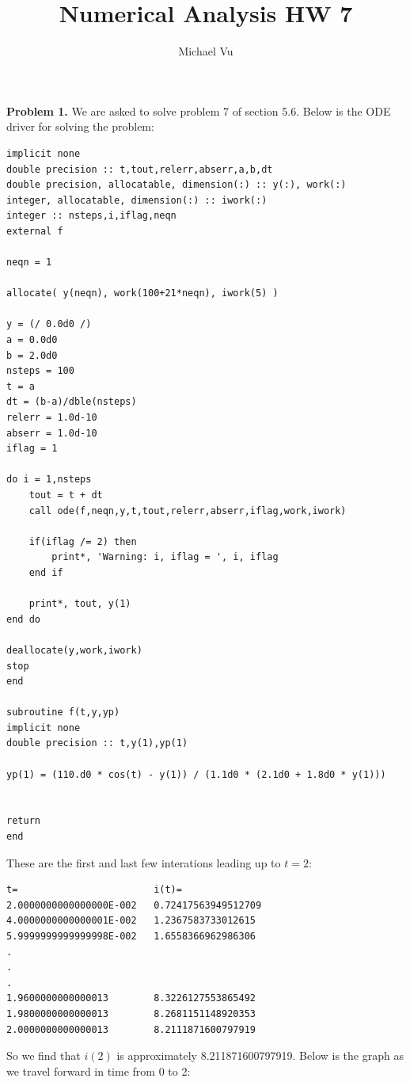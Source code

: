 \documentclass[12pt]{article}
\author{Michael Vu}
\title{Numerical Analysis HW 7}
\begin{document}
\maketitle 

\textbf{Problem 1.} We are asked to solve problem 7 of section 5.6. Below is the ODE driver for solving the problem:

\begin{verbatim}
implicit none
double precision :: t,tout,relerr,abserr,a,b,dt
double precision, allocatable, dimension(:) :: y(:), work(:)
integer, allocatable, dimension(:) :: iwork(:)
integer :: nsteps,i,iflag,neqn
external f

neqn = 1

allocate( y(neqn), work(100+21*neqn), iwork(5) )

y = (/ 0.0d0 /)
a = 0.0d0
b = 2.0d0
nsteps = 100
t = a
dt = (b-a)/dble(nsteps)
relerr = 1.0d-10
abserr = 1.0d-10
iflag = 1

do i = 1,nsteps
	tout = t + dt
	call ode(f,neqn,y,t,tout,relerr,abserr,iflag,work,iwork)
	
	if(iflag /= 2) then
		print*, 'Warning: i, iflag = ', i, iflag
	end if
	
	print*, tout, y(1)
end do

deallocate(y,work,iwork)
stop
end

subroutine f(t,y,yp)
implicit none
double precision :: t,y(1),yp(1)

yp(1) = (110.d0 * cos(t) - y(1)) / (1.1d0 * (2.1d0 + 1.8d0 * y(1)))


return
end
\end{verbatim}

These are the first and last few interations leading up to $t=2$:

\begin{verbatim}
t=                        i(t)=
2.0000000000000000E-002   0.72417563949512709
4.0000000000000001E-002   1.2367583733012615
5.9999999999999998E-002   1.6558366962986306
.
.
.
1.9600000000000013        8.3226127553865492
1.9800000000000013        8.2681151148920353
2.0000000000000013        8.2111871600797919 
\end{verbatim}

So we find that $i(2)$ is approximately 8.211871600797919. Below is the graph as we travel forward in time from 0 to 2:
\end{document}
